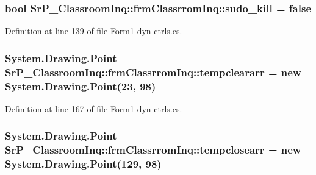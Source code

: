 \hypertarget{class_sr_p___classroom_inq_1_1frm_classrrom_inq_a3ac2217a30904b65be786ee00a312fea}{
\subsubsection[{sudo\-\_\-kill}]{\setlength{\rightskip}{0pt plus 5cm}bool {\bf \-Sr\-P\-\_\-\-Classroom\-Inq\-::frm\-Classrrom\-Inq\-::sudo\-\_\-kill} = false}}
\label{class_sr_p___classroom_inq_1_1frm_classrrom_inq_a3ac2217a30904b65be786ee00a312fea}


\-Definition at line \hyperlink{_form1-dyn-ctrls_8cs_source_l00139}{139} of file \hyperlink{_form1-dyn-ctrls_8cs_source}{\-Form1-\/dyn-\/ctrls.\-cs}.

\hypertarget{class_sr_p___classroom_inq_1_1frm_classrrom_inq_a189c01a3745fca62a8250be6a3517894}{
\subsubsection[{tempcleararr}]{\setlength{\rightskip}{0pt plus 5cm}\-System.\-Drawing.\-Point {\bf \-Sr\-P\-\_\-\-Classroom\-Inq\-::frm\-Classrrom\-Inq\-::tempcleararr} = new \-System.\-Drawing.\-Point(23, 98)}}
\label{class_sr_p___classroom_inq_1_1frm_classrrom_inq_a189c01a3745fca62a8250be6a3517894}


\-Definition at line \hyperlink{_form1-dyn-ctrls_8cs_source_l00167}{167} of file \hyperlink{_form1-dyn-ctrls_8cs_source}{\-Form1-\/dyn-\/ctrls.\-cs}.

\hypertarget{class_sr_p___classroom_inq_1_1frm_classrrom_inq_a6ad2bdb537cfc35b174dd16dd8e03904}{
\subsubsection[{tempclosearr}]{\setlength{\rightskip}{0pt plus 5cm}\-System.\-Drawing.\-Point {\bf \-Sr\-P\-\_\-\-Classroom\-Inq\-::frm\-Classrrom\-Inq\-::tempclosearr} = new \-System.\-Drawing.\-Point(129, 98)}}
\label{class_sr_p___classroom_inq_1_1frm_classrrom_inq_a6ad2bdb537cfc35b174dd16dd8e03904}


